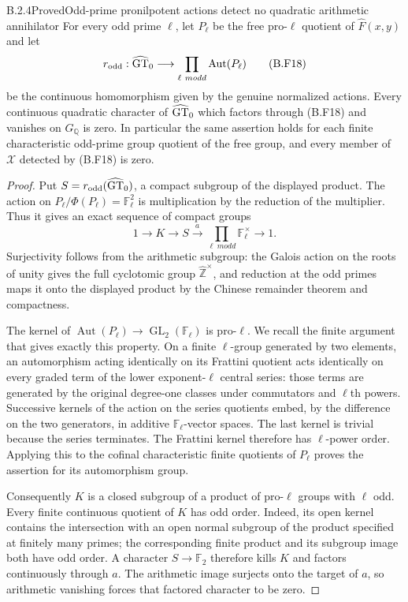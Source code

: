 \begin{result}{B.2.4}{Proved}{Odd-prime pronilpotent actions detect no quadratic arithmetic annihilator}
For every odd prime $\ell$, let $P_\ell$ be the free
pro-$\ell$ quotient of $\widehat F(x,y)$ and let
\[
 r_{\rm odd}:\widehat{\mathrm{GT}}_0\longrightarrow
       \prod_{\ell\ {
m odd}}\operatorname{Aut}(P_\ell)
                                                               \tag{B.F18}
\]
be the continuous homomorphism given by the genuine normalized
actions. Every continuous quadratic character of $\widehat{\mathrm{GT}}_0$
which factors through (B.F18) and vanishes on $G_{\mathbb Q}$
is zero. In particular the same assertion holds for each
finite characteristic odd-prime group quotient of the free
group, and every member of $\mathscr X$ detected by
(B.F18) is zero.
\end{result}
\begin{proof}
Put $S=r_{\rm odd}(\widehat{\mathrm{GT}}_0)$, a compact subgroup of the
displayed product. The action on
$P_\ell/\Phi(P_\ell)=\mathbb F_\ell^2$ is multiplication
by the reduction of the multiplier. Thus it gives an exact
sequence of compact groups
\[
 1\longrightarrow K\longrightarrow S
     \xrightarrow{\,a\,}
       \prod_{\ell\ {
m odd}}\mathbb F_\ell^\times
     \longrightarrow1.                                    \tag{B.F19}
\]
Surjectivity follows from the arithmetic subgroup: the Galois
action on the roots of unity gives the full cyclotomic group
$\widehat{\mathbb Z}^{\times}$, and reduction at the odd
primes maps it onto the displayed product by the Chinese
remainder theorem and compactness.

The kernel of
$\operatorname{Aut}(P_\ell)\to
\operatorname{GL}_2(\mathbb F_\ell)$ is pro-$\ell$.
We recall the finite argument that gives exactly this
property. On a finite $\ell$-group generated by two
elements, an automorphism acting identically on its
Frattini quotient acts identically on every graded term
of the lower exponent-$\ell$ central series: those
terms are generated by the original degree-one classes
under commutators and $\ell$th powers. Successive
kernels of the action on the series quotients embed,
by the difference on the two generators, in additive
$\mathbb F_\ell$-vector spaces. The last kernel is
trivial because the series terminates. The Frattini
kernel therefore has $\ell$-power order. Applying this
to the cofinal characteristic finite quotients of
$P_\ell$ proves the assertion for its automorphism
group.

Consequently $K$ is a closed subgroup of a product of
pro-$\ell$ groups with $\ell$ odd. Every finite
continuous quotient of $K$ has odd order. Indeed, its
open kernel contains the intersection with an open
normal subgroup of the product specified at finitely
many primes; the corresponding finite product and
its subgroup image both have odd order. A character
$S\to\mathbb F_2$ therefore kills $K$ and factors
continuously through $a$. The arithmetic image
surjects onto the target of $a$, so arithmetic
vanishing forces that factored character to be zero.


\end{proof}
